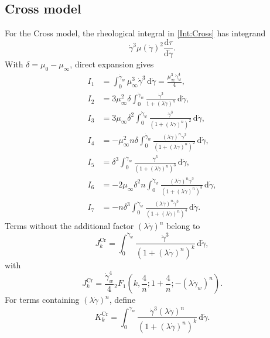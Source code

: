 \documentclass[lineno]{jfm}
\begin{document}
\subsection{Cross model}
For the Cross model, the rheological integral in \eqref{Int:Cross} has
integrand
\[
\dot\gamma^{3}\mu(\dot\gamma)^{2}
\frac{\mathrm{d}\tau}{\mathrm{d}\dot\gamma}.
\]
With $\delta=\mu_0-\mu_\infty$, direct expansion gives
\begin{align}
I_1
&=
\int_0^{\dot{\gamma}_w}
\mu_{\infty}^3\dot{\gamma}^3
\,\mathrm{d}\dot{\gamma}
=
\frac{\mu_{\infty}^3\dot{\gamma}_w^4}{4},
\\[6pt]
I_2
&=
3\mu_{\infty}^2\delta
\int_0^{\dot{\gamma}_w}
\frac{\dot{\gamma}^3}
{1+(\lambda\dot{\gamma})^n}
\,\mathrm{d}\dot{\gamma},
\\[6pt]
I_3
&=
3\mu_{\infty}\delta^2
\int_0^{\dot{\gamma}_w}
\frac{\dot{\gamma}^3}
{\left(1+(\lambda\dot{\gamma})^n\right)^2}
\,\mathrm{d}\dot{\gamma},
\\[6pt]
I_4
&=
-\mu_{\infty}^2n\delta
\int_0^{\dot{\gamma}_w}
\frac{(\lambda\dot{\gamma})^n\dot{\gamma}^3}
{\left(1+(\lambda\dot{\gamma})^n\right)^2}
\,\mathrm{d}\dot{\gamma},
\\[6pt]
I_5
&=
\delta^3
\int_0^{\dot{\gamma}_w}
\frac{\dot{\gamma}^3}
{\left(1+(\lambda\dot{\gamma})^n\right)^3}
\,\mathrm{d}\dot{\gamma},
\\[6pt]
I_6
&=
-2\mu_{\infty}\delta^2n
\int_0^{\dot{\gamma}_w}
\frac{(\lambda\dot{\gamma})^n\dot{\gamma}^3}
{\left(1+(\lambda\dot{\gamma})^n\right)^3}
\,\mathrm{d}\dot{\gamma},
\\[6pt]
I_7
&=
-n\delta^3
\int_0^{\dot{\gamma}_w}
\frac{(\lambda\dot{\gamma})^n\dot{\gamma}^3}
{\left(1+(\lambda\dot{\gamma})^n\right)^4}
\,\mathrm{d}\dot{\gamma}.
\end{align}
Terms without the additional factor $(\lambda\dot\gamma)^n$ belong to
\begin{equation}
J_k^{\mathrm{Cr}}
=
\int_0^{\dot{\gamma}_w}
\frac{\dot{\gamma}^3}
{\left(1+(\lambda\dot{\gamma})^n\right)^k}
\,\mathrm{d}\dot{\gamma},
\label{eq:app-J-Cross}
\end{equation}
with
\begin{equation}
J_k^{\mathrm{Cr}}
=
\frac{\dot{\gamma}_w^4}{4}
{}_2F_1\!\left(
k,\frac{4}{n};
1+\frac{4}{n};
-(\lambda\dot{\gamma}_w)^n
\right).
\label{eq:app-J-Cross-hyper}
\end{equation}
For terms containing $(\lambda\dot\gamma)^n$, define
\begin{equation}
K_k^{\mathrm{Cr}}
=
\int_0^{\dot{\gamma}_w}
\frac{\dot{\gamma}^3(\lambda\dot{\gamma})^n}
{\left(1+(\lambda\dot{\gamma})^n\right)^k}
\,\mathrm{d}\dot{\gamma}.
\label{eq:app-K-Cross}
\end{equation}
\end{document}
